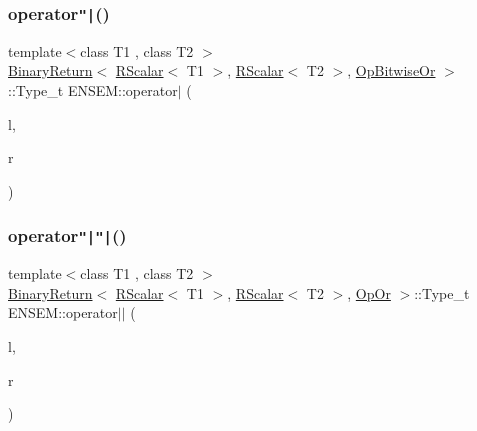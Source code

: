 \mbox{\label{group__rscalar_ga9e5397786fb0d112594a1fb887b1a58d}} 
\subsubsection{\texorpdfstring{operator\texttt{"|}()}{operator|()}}
{\footnotesize\ttfamily template$<$class T1 , class T2 $>$ \\
\mbox{\hyperlink{structENSEM_1_1BinaryReturn}{Binary\+Return}}$<$ \mbox{\hyperlink{classENSEM_1_1RScalar}{R\+Scalar}}$<$ T1 $>$, \mbox{\hyperlink{classENSEM_1_1RScalar}{R\+Scalar}}$<$ T2 $>$, \mbox{\hyperlink{structENSEM_1_1OpBitwiseOr}{Op\+Bitwise\+Or}} $>$\+::Type\+\_\+t E\+N\+S\+E\+M\+::operator$\vert$ (\begin{DoxyParamCaption}\item[{const \mbox{\hyperlink{classENSEM_1_1RScalar}{R\+Scalar}}$<$ T1 $>$ \&}]{l,  }\item[{const \mbox{\hyperlink{classENSEM_1_1RScalar}{R\+Scalar}}$<$ T2 $>$ \&}]{r }\end{DoxyParamCaption})\hspace{0.3cm}{\ttfamily [inline]}}

\mbox{\label{group__rscalar_gad6b0ec6a8079826234d7bef5fa862c57}} 
\subsubsection{\texorpdfstring{operator\texttt{"|}\texttt{"|}()}{operator||()}}
{\footnotesize\ttfamily template$<$class T1 , class T2 $>$ \\
\mbox{\hyperlink{structENSEM_1_1BinaryReturn}{Binary\+Return}}$<$ \mbox{\hyperlink{classENSEM_1_1RScalar}{R\+Scalar}}$<$ T1 $>$, \mbox{\hyperlink{classENSEM_1_1RScalar}{R\+Scalar}}$<$ T2 $>$, \mbox{\hyperlink{structENSEM_1_1OpOr}{Op\+Or}} $>$\+::Type\+\_\+t E\+N\+S\+E\+M\+::operator$\vert$$\vert$ (\begin{DoxyParamCaption}\item[{const \mbox{\hyperlink{classENSEM_1_1RScalar}{R\+Scalar}}$<$ T1 $>$ \&}]{l,  }\item[{const \mbox{\hyperlink{classENSEM_1_1RScalar}{R\+Scalar}}$<$ T2 $>$ \&}]{r }\end{DoxyParamCaption})\hspace{0.3cm}{\ttfamily [inline]}}

